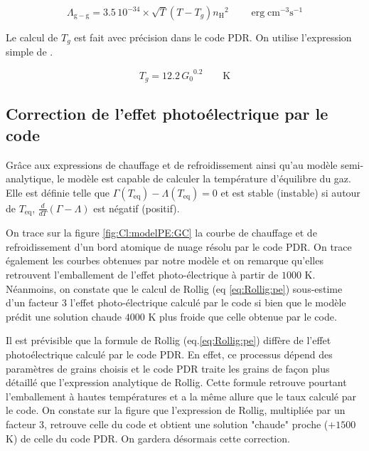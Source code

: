 \begin{equation}
    \Lambda_{\mathrm{g}-\mathrm{g}} = 3.5\,10^{-34}\times \sqrt{T}(T - T_g) {n_\mathrm{H}}^2 \qquad \operatorname{erg} \mathrm{cm}^{-3} \mathrm{s}^{-1}
\end{equation}

Le calcul de $T_g$ est fait avec précision dans le code PDR. On utilise l'expression simple de \cite{Hollenbach1991}. 

\begin{equation}
    T_g = 12.2 \,{G_0}^{0.2} \qquad \mathrm{K}
\end{equation}



\subsection{Correction de l'effet photoélectrique par le code}

Grâce aux expressions de chauffage et de refroidissement ainsi qu'au modèle semi-analytique, le modèle est capable de calculer la température d'équilibre du gaz. Elle est définie telle que $\Gamma(T_{\mathrm{eq}}) - \Lambda(T_{\mathrm{eq}}) = 0$ et est stable (instable) si autour de $T_{\mathrm{eq}}$, $\frac{d}{dT}(\Gamma - \Lambda)$ est négatif (positif). \newline 

On trace sur la figure \ref{fig:Cl:modelPE:GC} la courbe de chauffage et de refroidissement d'un bord atomique de nuage résolu par le code PDR. On trace également les courbes obtenues par notre modèle et on remarque qu'elles retrouvent l'emballement de l'effet photo-électrique à partir de $1000$ K. Néanmoins, on constate que le calcul de Rollig (eq \ref{eq:Rollig:pe}) sous-estime d'un facteur 3 l'effet photo-électrique calculé par le code si bien que le modèle prédit une solution \og chaude \fg{} $4000$ K plus froide que celle obtenue par le code. \newline 

Il est prévisible que la formule de Rollig (eq.\ref{eq:Rollig:pe}) diffère de l'effet photoélectrique calculé par le code PDR. En effet, ce processus dépend des paramètres de grains choisis et le code PDR traite les grains de façon plus détaillé que l'expression analytique de Rollig. Cette formule retrouve pourtant l'emballement à hautes températures et a la même allure que le taux calculé par le code. On constate sur la figure \label{fig:Cl:modelPE:GC3} que l'expression de Rollig, multipliée par un facteur 3, retrouve celle du code et obtient une solution "chaude" proche ($+1500$ K) de celle du code PDR. On gardera désormais cette correction. 


